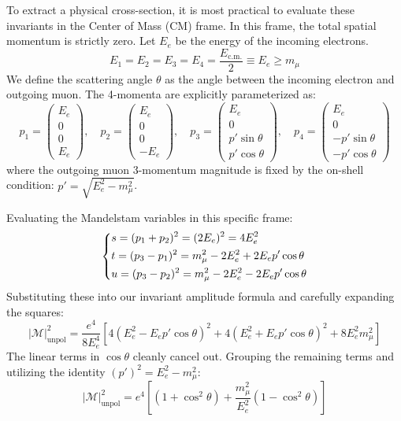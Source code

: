 To extract a physical cross-section, it is most practical to evaluate these invariants in the Center of Mass (CM) frame. In this frame, the total spatial momentum is strictly zero. Let $E_e$ be the energy of the incoming electrons.
\[
    E_1 = E_2 = E_3 = E_4 = \frac{E_{\text{c.m.}}}{2} \equiv E_e \geq m_\mu
\]
We define the scattering angle $\theta$ as the angle between the incoming electron and outgoing muon. The 4-momenta are explicitly parameterized as:
\[
    p_1 = \begin{pmatrix} E_e \\ 0 \\ 0 \\ E_e \end{pmatrix}, \quad p_2 = \begin{pmatrix} E_e \\ 0 \\ 0 \\ -E_e \end{pmatrix}, \quad p_3 = \begin{pmatrix} E_e \\ 0 \\ p' \sin\theta \\ p' \cos\theta \end{pmatrix}, \quad p_4 = \begin{pmatrix} E_e \\ 0 \\ -p' \sin\theta \\ -p' \cos\theta \end{pmatrix}
\]
where the outgoing muon 3-momentum magnitude is fixed by the on-shell condition: $p' = \sqrt{E_e^2 - m_\mu^2}$.

Evaluating the Mandelstam variables in this specific frame:
\[
    \begin{dcases}
        s = (p_1 + p_2)^2 = (2E_e)^2 = 4E_e^2                     \\
        t = (p_3 - p_1)^2 = m_\mu^2 - 2E_e^2 + 2E_e p' \cos\theta \\
        u = (p_3 - p_2)^2 = m_\mu^2 - 2E_e^2 - 2E_e p' \cos\theta
    \end{dcases}
\]
Substituting these into our invariant amplitude formula and carefully expanding the squares:
\[
    \vert \mathcal{M} \vert_{\text{unpol}}^2 = \frac{e^4}{8 E_e^4} \left[ 4(E_e^2 - E_e p' \cos\theta)^2 + 4(E_e^2 + E_e p' \cos\theta)^2 + 8E_e^2 m_\mu^2 \right]
\]
The linear terms in $\cos\theta$ cleanly cancel out. Grouping the remaining terms and utilizing the identity $(p')^2 = E_e^2 - m_\mu^2$:
\[
    \vert \mathcal{M} \vert_{\text{unpol}}^2 = e^4 \left[ (1 + \cos^2\theta) + \frac{m_\mu^2}{E_e^2} (1 - \cos^2\theta) \right]
\]

